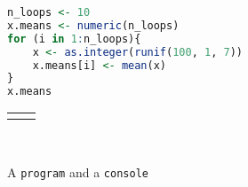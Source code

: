 \documentclass[10pt,]{article}
\theoremstyle{plain}
\theoremstyle{definition}
\theoremstyle{definition}
\theoremstyle{definition}
\theoremstyle{definition}
\theoremstyle{definition}
\theoremstyle{definition}
\numberwithin{equation}{section}
\newcommand{\consoleinput}[1]{\textbf{#1}}
\newlength{\panelmax}
\begin{document}
\begin{figure}
\centering
{%
\setlength{\panelmax}{0pt}
\ifdefined\panelboxAprogram\else\newsavebox{\panelboxAprogram}\fi%
\begin{lrbox}{\panelboxAprogram}
\begin{lstlisting}[style=genericinput, language=R, linewidth=0.4\linewidth]
n_loops <- 10
x.means <- numeric(n_loops)
for (i in 1:n_loops){
    x <- as.integer(runif(100, 1, 7))
    x.means[i] <- mean(x)
}
x.means
\end{lstlisting}
\end{lrbox}
\ifdefined\phAprogram\else\newlength{\phAprogram}\fi%
\setlength{\phAprogram}{\ht\panelboxAprogram+\dp\panelboxAprogram}
\settototalheight{\phAprogram}{\usebox{\panelboxAprogram}}
\setlength{\panelmax}{\maxof{\panelmax}{\phAprogram}}
\ifdefined\panelboxAconsole\else\newsavebox{\panelboxAconsole}\fi%
\begin{lrbox}{\panelboxAconsole}
\end{lrbox}
\ifdefined\phAconsole\else\newlength{\phAconsole}\fi%
\setlength{\phAconsole}{\ht\panelboxAconsole+\dp\panelboxAconsole}
\settototalheight{\phAconsole}{\usebox{\panelboxAconsole}}
\setlength{\panelmax}{\maxof{\panelmax}{\phAconsole}}
\leavevmode%
\setlength{\tabcolsep}{0.025\linewidth}
\par\medskip\noindent
\hspace*{0.05\linewidth}%
\begin{tabular}{@{}*{2}{c}@{}}
\begin{minipage}[c][\panelmax][t]{0.4\linewidth}\usebox{\panelboxAprogram}\end{minipage}&
\begin{minipage}[c][\panelmax][t]{0.45\linewidth}\usebox{\panelboxAconsole}\end{minipage}\end{tabular}\\
}%
\caption{A \lstinline?program? and a \lstinline?console?\label{figure-116}}
\end{figure}
\end{document}
